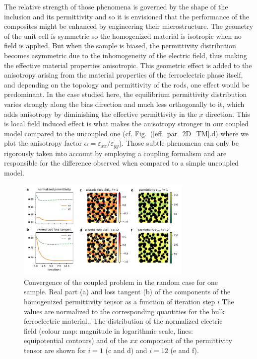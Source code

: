\documentclass[%
 aip,
 amsmath,amssymb,
 reprint,%
linenumbers
]{revtex4-1}
\newcommand{\co}[1]{\textcolor{correction}{#1}}
\begin{document}
The relative strength of those phenomena is governed by the shape of the inclusion and its permittivity
and so it is envisioned that the performance of the composites might be enhanced by engineering
their microstructure.
The geometry of the unit cell is symmetric so the homogenized material is
isotropic when no field is applied.
But when the sample is biased, the permittivity distribution becomes asymmetric due
to the inhomogeneity of the electric field, thus making the effective material properties anisotropic.
This geometric effect is added to the anisotropy arising from the material properties of the ferroelectric
phase itself, and depending on the topology and permittivity of the rods, one effect would be predominant.
In the case studied here, the equilibrium permittivity distribution varies strongly along the bias
 direction and much less orthogonally to it, which adds anisotropy by diminishing the effective
 permittivity in the $x$ direction. This is local field induced effect is what makes the anisotropy stronger
 in our coupled model compared to the uncoupled one (cf. Fig.~(\ref{eff_par_2D_TM}.d) \co{where we plot the anisotropy factor \co{$\alpha =\varepsilon_{xx} / \varepsilon_{yy}$}}).
Those subtle phenomena can only be rigorously taken into account by employing a coupling formalism
and are responsible for the difference observed when compared to a simple uncoupled model.\\
\begin{figure}[!t]
 \centering
 \includegraphics[width=0.75\textwidth]{convergence_rand}
 \caption{Convergence of the coupled problem in the random case
  for one sample.
  Real part (a) and loss tangent (b) of the components of the homogenized
  permittivity tensor as a function of iteration step $i$ \co{The values are normalized to the corresponding quantities for the bulk ferroelectric material.}. The distribution of
  the normalized electric field (colour map: magnitude in logarithmic scale,
  lines: equipotential contours) and of the $xx$ component of the permittivity tensor are shown for $i=1$
  (c and d) and $i=12$ (e and f).
 }
 \label{conv_random}
\end{figure}
\end{document}
